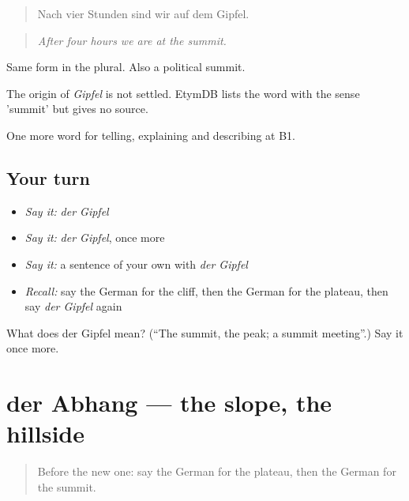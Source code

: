 \begin{quote}
Nach vier Stunden sind wir auf dem Gipfel.
\end{quote}

\begin{quote}
\emph{After four hours we are at the summit.}
\end{quote}

Same form in the plural. Also a political summit.

\begin{cousinweb}
The origin of \emph{Gipfel} is not settled. EtymDB lists the word with the sense 'summit' but gives no source.
\end{cousinweb}

\begin{grammarlens}[title={What you've built}]
One more word for telling, explaining and describing at B1.
\end{grammarlens}

\subsection*{Your turn}
\begin{itemize}
\raggedright
  \item \emph{Say it:} \emph{der Gipfel}
  \item \emph{Say it:} \emph{der Gipfel}, once more
  \item \emph{Say it:} a sentence of your own with \emph{der Gipfel}
  \item \emph{Recall:} say the German for the cliff, then the German for the plateau, then say \emph{der Gipfel} again
\end{itemize}

\begin{tcolorbox}[breakable,colback=teal!4,colframe=teal!35!black,title={Before you move on}]
What does der Gipfel mean? (\textquotedblleft{}The summit, the peak; a summit meeting\textquotedblright{}.) Say it once more.
\end{tcolorbox}
\section[der Abhang]{der Abhang — the slope, the hillside}

\label{lesson:GE-C453-abhang}



\begin{quote}
Before the new one: say the German for the plateau, then the German for the summit.
\end{quote}

